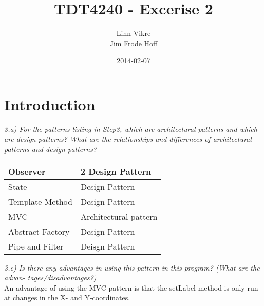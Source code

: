 \documentclass[]{article}
\title{TDT4240 - Excerise 2}
\author{Linn Vikre\\ Jim Frode Hoff}
\date{2014-02-07}
\begin{document}
\ifpdf
{}
\else
{}
\fi

\maketitle

\section{Introduction}
\emph{3.a) For the patterns listing in Step3, which are architectural patterns 
and which are design patterns? What are the relationships and differences of 
architectural patterns and design patterns?}
\\

\begin{tabular}{ | l | l | } \hline
  Observer & 2 Design Pattern \\ \hline
  State & Design Pattern \\ \hline
  Template Method & Design Pattern \\ \hline
  MVC & Architectural pattern \\ \hline
  Abstract Factory & Design Pattern \\ \hline
  Pipe and Filter & Deisgn Pattern \\ \hline
\end{tabular}


\emph{3.c) Is there any advantages in using this pattern in this program? (What are the advan- tages/disadvantages?)}\\
An advantage of using the MVC-pattern is that the setLabel-method is only run at changes in the X- and Y-coordinates.






\end{document}
